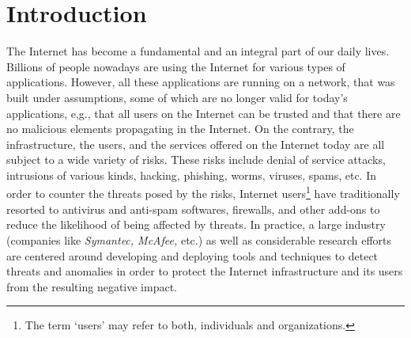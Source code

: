 \documentclass[letterpaper,12pt, onecolumn, nodraft]{IEEEtran}
\begin{document}
\section{Introduction} \label{sec-intro}
The Internet has become a fundamental and an integral part of our daily lives. Billions of people nowadays are using the Internet for various types of applications. However, all these applications are running on a network, that was built under assumptions, some of which are no longer valid for today's applications, e,g., that all users on the Internet can be trusted and that there are no malicious elements propagating in the Internet. On the contrary, the infrastructure, the users, and the services offered on the Internet today are all subject to a wide variety of risks. These risks include denial of service attacks, intrusions of various kinds, hacking, phishing, worms, viruses, spams, etc. In order to counter the threats posed by the risks, Internet users\footnote{The term `users' may refer to both, individuals and organizations.} have traditionally resorted to antivirus and anti-spam softwares, firewalls, and other add-ons to reduce the likelihood of being affected by threats. In practice, a large industry (companies like \emph{Symantec, McAfee,} etc.) as well as considerable research efforts are centered around developing and deploying tools and techniques to detect threats and anomalies in order to protect the Internet infrastructure and its users from the resulting negative impact.
\end{document}
